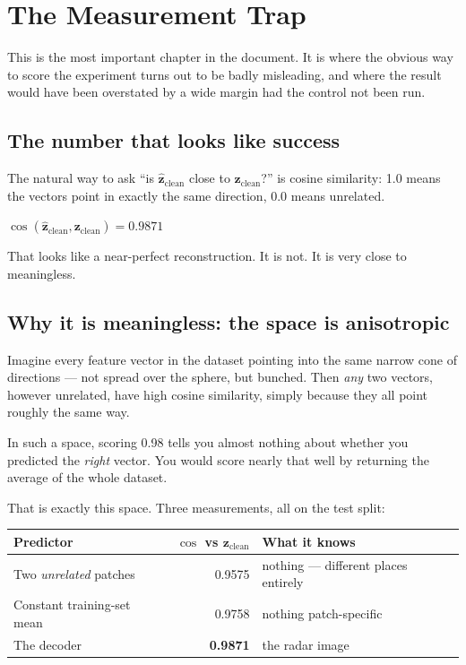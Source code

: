 \documentclass[11pt,a4paper]{report}
\newcommand{\zc}{\mathbf{z}_{\text{clean}}}
\newcommand{\zh}{\hat{\mathbf{z}}_{\text{clean}}}
\begin{document}
\chapter{The Measurement Trap}
\label{ch:trap}

This is the most important chapter in the document. It is where the obvious way
to score the experiment turns out to be badly misleading, and where the result
would have been overstated by a wide margin had the control not been run.

\section{The number that looks like success}

The natural way to ask ``is $\zh$ close to $\zc$?'' is cosine similarity: 1.0
means the vectors point in exactly the same direction, 0.0 means unrelated.

\begin{center}
\Large
$\cos(\zh, \zc) = 0.9871$
\end{center}

That looks like a near-perfect reconstruction. It is not. It is very close to
meaningless.

\section{Why it is meaningless: the space is anisotropic}

\begin{intuition}
Imagine every feature vector in the dataset pointing into the same narrow cone
of directions --- not spread over the sphere, but bunched. Then \emph{any} two
vectors, however unrelated, have high cosine similarity, simply because they all
point roughly the same way.

\medskip
In such a space, scoring 0.98 tells you almost nothing about whether you
predicted the \emph{right} vector. You would score nearly that well by returning
the average of the whole dataset.
\end{intuition}

That is exactly this space. Three measurements, all on the test split:

\begin{center}
\small
\begin{tabular}{@{}lrp{6.4cm}@{}}
\toprule
\textbf{Predictor} & $\cos$ vs $\zc$ & \textbf{What it knows} \\
\midrule
Two \emph{unrelated} patches & 0.9575 & nothing --- different places entirely \\
Constant training-set mean & 0.9758 & nothing patch-specific \\
The decoder & \textbf{0.9871} & the radar image \\
\bottomrule
\end{tabular}
\end{center}
\end{document}
